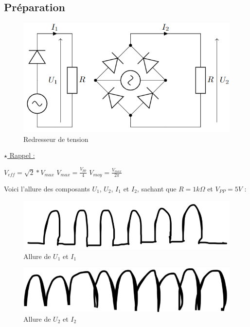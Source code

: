 \subsection{Préparation}

\begin{figure}[H]
    \begin{center}
    \includegraphics[scale=0.5]{images/4.png}
    \caption{Redresseur de tension}
    \end{center}
\end{figure}

\underline{$\star$ Rappel :}

$V_{eff}=\sqrt{2}*V_{max}$
$V_{max}=\frac{V_{pp}}{4}$
$V_{moy}=\frac{V_{max}}{2\pi}$

Voici l'allure des composants $U_1$, $U_2$, $I_1$ et $I_2$, sachant que $R=1k\Omega$ et $V_{PP}=5V$ :


\begin{figure}[H]
    \begin{center}
    \includegraphics[scale=0.5]{images/boucle1.png}
    \caption{Allure de $U_1$ et $I_1$}
    \end{center}
\end{figure}

\begin{figure}[H]
    \begin{center}
    \includegraphics[scale=0.5]{images/boucle2.png}
    \caption{Allure de $U_2$ et $I_2$}
    \end{center}
\end{figure}

